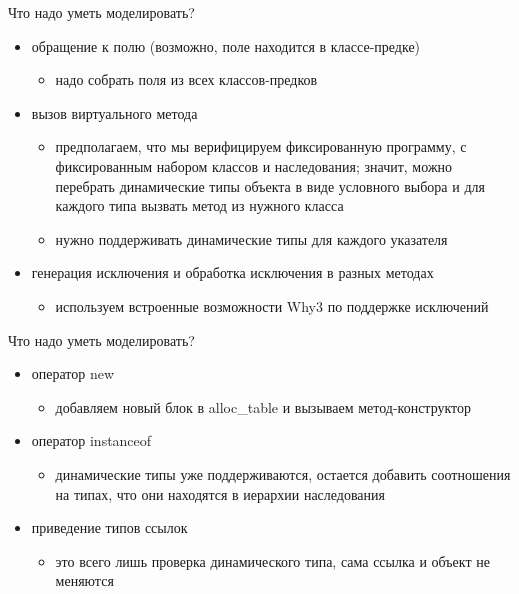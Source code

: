 \documentclass[hyperref={unicode=true}]{beamer}
\begin{document}
    \begin{frame}{Что надо уметь моделировать?}
    \begin{itemize}
    \item
    обращение к полю (возможно, поле находится в классе-предке)
        \begin{itemize}
        \item
        надо собрать поля из всех классов-предков
        \end{itemize}
    \item
    вызов виртуального метода
        \begin{itemize}
        \item
        предполагаем, что мы верифицируем фиксированную программу,
        с фиксированным набором классов и наследования; значит,
        можно перебрать динамические типы объекта в виде условного
        выбора и для каждого типа вызвать метод из нужного класса
        \item
        нужно поддерживать динамические типы для каждого указателя
        \end{itemize}
    \item
    генерация исключения и обработка исключения в разных методах
        \begin{itemize}
        \item
        используем встроенные возможности Why3 по поддержке
        исключений
        \end{itemize}
    \end{itemize}
    \end{frame}

    \begin{frame}{Что надо уметь моделировать?}
    \begin{itemize}
    \item
    оператор new
        \begin{itemize}
        \item
        добавляем новый блок в alloc\_table и вызываем
        метод-конструктор
        \end{itemize}
    \item
    оператор instanceof
        \begin{itemize}
        \item
        динамические типы уже поддерживаются, остается добавить
        соотношения на типах, что они находятся в иерархии наследования
        \end{itemize}
    \item
    приведение типов ссылок
        \begin{itemize}
        \item
        это всего лишь проверка динамического типа, сама ссылка
        и объект не меняются
        \end{itemize}
    \end{itemize}
    \end{frame}
\end{document}
